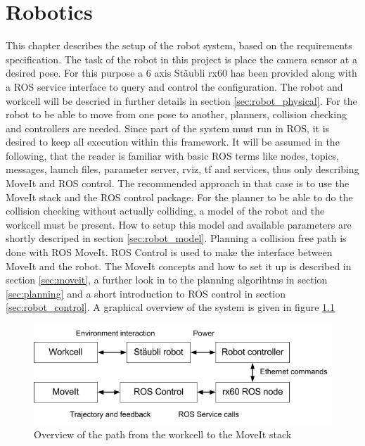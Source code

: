 \chapter{Robotics}
This chapter describes the setup of the robot system, based on the requirements specification. The task of the robot in this project is place the camera sensor at a desired pose. For this purpose a 6 axis Stäubli rx60 has been provided along with a ROS service interface to query and control the configuration. The robot and workcell will be descried in further details in section \ref{sec:robot_physical}. For the robot to be able to move from one pose to another, planners, collision checking and controllers are needed. Since part of the system must run in ROS, it is desired to keep all execution within this framework. It will be assumed in the following, that the reader is familiar with basic ROS terms like nodes, topics, messages, launch files, parameter server, rviz, tf and services, thus only describing MoveIt and ROS control. The recommended approach in that case is to use the MoveIt stack and the ROS control package.  For the planner to be able to do the collision checking without actually colliding, a model of the robot and the workcell must be present. How to setup this model and available parameters are shortly descriped in section \ref{sec:robot_model}. Planning a collision free path is done with ROS MoveIt. ROS Control is used to make the interface between MoveIt and the robot. The MoveIt concepts and how to set it up is described in section \ref{sec:moveit}, a further look in to the planning algorihtms in section \ref{sec:planning} and a short introduction to ROS control in section \ref{sec:robot_control}. A graphical overview of the system is given in figure \ref{fig:workcell_to_moveit_path}


\begin{figure}[htb]
	\begin{center}
		\includegraphics[scale=0.5,trim=0 0 0 0]{graphics/05_robotics/workcell_to_moveIt_path.png}%
		\caption{Overview of the path from the workcell to the MoveIt stack}
		\label{fig:workcell_to_moveit_path}
	\end{center}
\end{figure}

